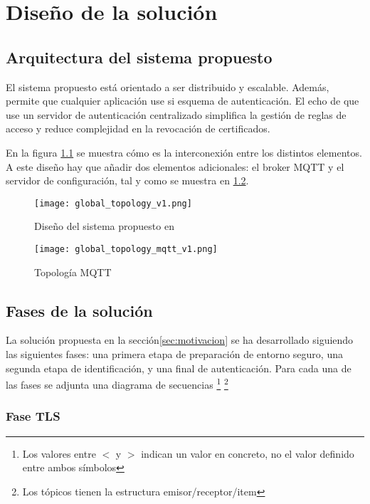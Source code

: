\chapter{Diseño de la solución}
\label{chap:diseño}

\section{Arquitectura del sistema propuesto}

El sistema propuesto está orientado a ser distribuido y escalable. Además, permite que cualquier aplicación use si esquema de 
autenticación. 
El echo de que use un servidor de autenticación centralizado simplifica la gestión de reglas de acceso y reduce complejidad en 
la revocación de certificados.

En la figura \ref{fig:multauth-diseño} se muestra cómo es la interconexión entre los distintos elementos. A este diseño hay que
añadir dos elementos adicionales: el broker MQTT y el servidor de configuración, tal y como se muestra en \ref{fig:mqtt-topology}.

\begin{figure}[H]
    \centering
    \texttt{[image: global\_topology\_v1.png]}
    \caption{Diseño del sistema propuesto en \cite{multipauthpaper}}
    \label{fig:multauth-diseño}
\end{figure}

\begin{figure}[H]
    \centering
    \texttt{[image: global\_topology\_mqtt\_v1.png]}
    \caption{Topología MQTT}
    \label{fig:mqtt-topology}
\end{figure}

\section{Fases de la solución}

La solución propuesta en la sección\ref{sec:motivacion} se ha desarrollado siguiendo las siguientes fases: una primera etapa de preparación de
entorno seguro, una segunda etapa de identificación, y una final de autenticación. Para cada una de las fases se adjunta una 
diagrama de secuencias \footnote{Los valores entre $<$ y $>$ indican un valor en concreto, no el valor definido entre ambos 
símbolos} \footnote{Los tópicos tienen la estructura emisor/receptor/item}

\subsection{Fase TLS}
\label{sec:tls_phase}

